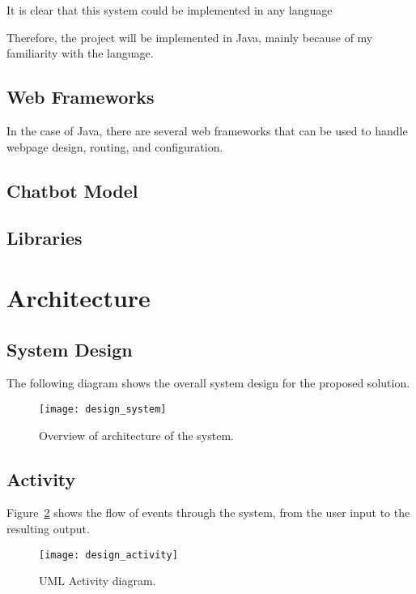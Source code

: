 It is clear that this system could be implemented in any language 

Therefore, the project will be implemented in Java, mainly because of my familiarity with the language.


\subsection{Web Frameworks}
In the case of Java, there are several web frameworks that can be used to handle webpage design, routing, and configuration.

\subsection{Chatbot Model}


\subsection{Libraries}

\newpage
\section{Architecture}
\subsection{System Design}
The following diagram shows the overall system design for the proposed solution.

\begin{figure}[h]
	\begin{center}
		\texttt{[image: design\_system]}
	\end{center}
	\caption{Overview of architecture of the system.}
	\label{fig:design_system}
\end{figure}

\newpage
\subsection{Activity}
Figure~\ref{fig:design_activity} shows the flow of events through the system, from the user input to the resulting output. 

\begin{figure}[h]
	\begin{center}
		\texttt{[image: design\_activity]}
	\end{center}
	\caption{UML Activity diagram.}
	\label{fig:design_activity}
\end{figure}

